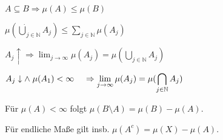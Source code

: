 \begin{description}[leftmargin=!,labelwidth=26mm]
	\item[Monotonie] $A \subseteq B \Rightarrow \mu(A) \leq \mu(B)$
	\item[$\sigma$-Subadditivität] $\mu(\dot\bigcup_{j\in \mathbb{N}} A_j) \leq \sum_{j\in \mathbb{N}} \mu(A_j)$
	\item[Stetigkeit (unten)] $A_j \uparrow \Rightarrow \displaystyle\lim_{j\to \infty} \mu(A_j) = \mu(\bigcup_{j\in \mathbb{N}} A_j)$
	\item[Stetigkeit (oben)] $A_j \downarrow \land \hspace*{1mm} \mu(A_1) < \infty \\ \hspace*{4mm}\Rightarrow \displaystyle\lim_{j\to \infty} \mu(A_j) = \mu(\bigcap_{j\in \mathbb{N}} A_j)$
\end{description}

Für $\mu(A) < \infty$ folgt $\mu(B\setminus A) = \mu(B) - \mu(A)$.

Für endliche Maße gilt insb. $\mu(A^c) = \mu(X) - \mu(A)$.
